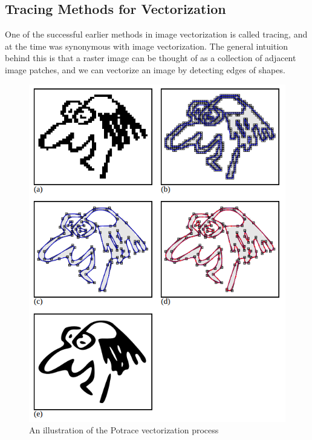 \subsection{Tracing Methods for Vectorization}

One of the successful earlier methods in image vectorization is called tracing, and at the time was synonymous with image vectorization. The general intuition behind this is that a raster image can be thought of as a collection of adjacent image patches, and we can vectorize an image by detecting edges of shapes.

\begin{figure}
    \centering
    \includegraphics[width=\textwidth]{Figures/potrace.png}
    \caption{An illustration of the Potrace \cite{selinger2003potrace} vectorization process}
    \label{fig:potrace}
\end{figure}

